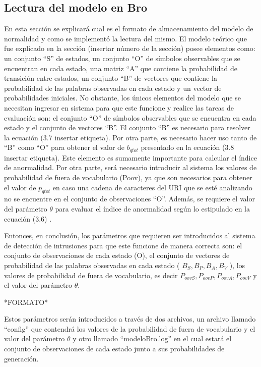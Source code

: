\subsection{Lectura del modelo en Bro}
\label{sec:lecturaModelo}
En esta sección se explicará cual es el formato de almacenamiento del modelo de normalidad y como se implementó la lectura del mismo. El modelo teórico que fue explicado en la sección (insertar número de la sección) posee elementos como: un conjunto “S” de estados, un conjunto “O” de símbolos observables que se encuentran en cada estado, una matriz “A” que contiene la probabilidad de transición entre estados, un conjunto “B” de vectores que contiene la probabilidad de las palabras observadas en cada estado y un vector de probabilidades iniciales. No obstante, los únicos elementos del modelo que se necesitan ingresar en sistema para que este funcione y realice las tareas de evaluación son: el conjunto “O” de símbolos observables que se encuentra en cada estado y el conjunto de vectores “B”. El conjunto “B” es necesario para resolver la ecuación (3.7 insertar etiqueta). Por otra parte, es necesario hacer uso tanto de “B” como “O” para obtener el valor de $b_{qtot}$ presentado en la ecuación (3.8 insertar etiqueta). Este elemento es sumamente importante para calcular el índice de anormalidad. Por otra parte, será necesario introducir al sistema los valores de probabilidad de fuera de vocabulario (Poov), ya que son necesarios para obtener el valor de $p_{qtot}$ en caso una cadena de caracteres del URI que se esté analizando no se encuentre en el conjunto de observaciones “O”. Además, se requiere el valor del parámetro $\theta$ para evaluar el índice de anormalidad según lo estipulado en la ecuación (3.6) .

    Entonces, en conclusión, los parámetros que requieren ser introducidos al sistema de detección de intrusiones para que este funcione de manera correcta son: el conjunto de observaciones de cada estado (O), el conjunto de vectores de probabilidad de las palabras observadas en cada estado ( $B_{S}, B_{P}, B_{A}, B_{V}$ ), los valores de probabilidad de fuera de vocabulario, es decir $P_{oovS}, P_{oovP}, P_{oovA}, P_{oovV}$ y el valor del parámetro $\theta$.

    *FORMATO*

Estos parámetros serán introducidos a través de dos archivos, un archivo llamado “config” que contendrá los valores de la probabilidad de fuera de vocabulario y el valor del parámetro $\theta$ y otro llamado “modeloBro.log” en el cual estará el conjunto de observaciones de cada estado junto a sus probabilidades de generación.

